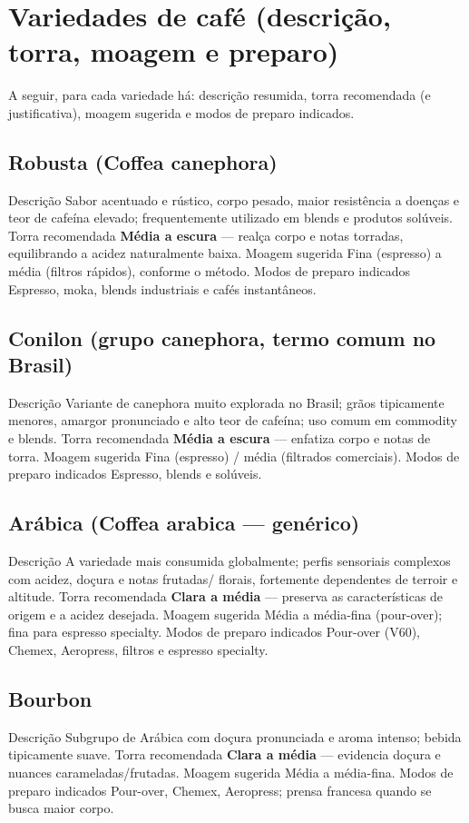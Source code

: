 \documentclass[a4paper,12pt]{article}
\begin{document}
\section{Variedades de café (descrição, torra, moagem e preparo)}
A seguir, para cada variedade há: descrição resumida, torra recomendada (e justificativa), moagem sugerida e modos de preparo indicados.

\subsection{Robusta (Coffea canephora)}
{Descrição} Sabor acentuado e rústico, corpo pesado, maior resistência a doenças e teor de cafeína elevado; frequentemente utilizado em blends e produtos solúveis.  
{Torra recomendada} \textbf{Média a escura} — realça corpo e notas torradas, equilibrando a acidez naturalmente baixa.  
{Moagem sugerida} Fina (espresso) a média (filtros rápidos), conforme o método.  
{Modos de preparo indicados} Espresso, moka, blends industriais e cafés instantâneos.

\subsection{Conilon (grupo canephora, termo comum no Brasil)}
{Descrição} Variante de canephora muito explorada no Brasil; grãos tipicamente menores, amargor pronunciado e alto teor de cafeína; uso comum em commodity e blends.  
{Torra recomendada} \textbf{Média a escura} — enfatiza corpo e notas de torra.  
{Moagem sugerida} Fina (espresso) / média (filtrados comerciais).  
{Modos de preparo indicados} Espresso, blends e solúveis.

\subsection{Arábica (Coffea arabica — genérico)}
{Descrição} A variedade mais consumida globalmente; perfis sensoriais complexos com acidez, doçura e notas frutadas/ florais, fortemente dependentes de terroir e altitude.  
{Torra recomendada} \textbf{Clara a média} — preserva as características de origem e a acidez desejada.  
{Moagem sugerida} Média a média-fina (pour-over); fina para espresso specialty.  
{Modos de preparo indicados} Pour-over (V60), Chemex, Aeropress, filtros e espresso specialty.

\subsection{Bourbon}
{Descrição} Subgrupo de Arábica com doçura pronunciada e aroma intenso; bebida tipicamente suave.  
{Torra recomendada} \textbf{Clara a média} — evidencia doçura e nuances carameladas/frutadas.  
{Moagem sugerida} Média a média-fina.  
{Modos de preparo indicados} Pour-over, Chemex, Aeropress; prensa francesa quando se busca maior corpo.
\end{document}
